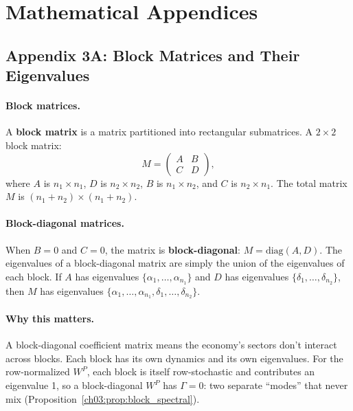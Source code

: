 \documentclass[../structural_economics_book.tex]{subfiles}
\begin{document}
\section*{Mathematical Appendices}

\subsection*{Appendix 3A: Block Matrices and Their Eigenvalues}
\label{ch03:app:block}

\paragraph{Block matrices.} A \textbf{block matrix} is a matrix partitioned into rectangular submatrices. A $2 \times 2$ block matrix:
\begin{equation}
M = \begin{pmatrix} A & B \\ C & D \end{pmatrix},
\end{equation}
where $A$ is $n_1 \times n_1$, $D$ is $n_2 \times n_2$, $B$ is $n_1 \times n_2$, and $C$ is $n_2 \times n_1$. The total matrix $M$ is $(n_1 + n_2) \times (n_1 + n_2)$.

\paragraph{Block-diagonal matrices.} When $B = 0$ and $C = 0$, the matrix is \textbf{block-diagonal}: $M = \text{diag}(A, D)$. The eigenvalues of a block-diagonal matrix are simply the union of the eigenvalues of each block. If $A$ has eigenvalues $\{\alpha_1, \ldots, \alpha_{n_1}\}$ and $D$ has eigenvalues $\{\delta_1, \ldots, \delta_{n_2}\}$, then $M$ has eigenvalues $\{\alpha_1, \ldots, \alpha_{n_1}, \delta_1, \ldots, \delta_{n_2}\}$.

\paragraph{Why this matters.} A block-diagonal coefficient matrix means the economy's sectors don't interact across blocks. Each block has its own dynamics and its own eigenvalues. For the row-normalized $W^P$, each block is itself row-stochastic and contributes an eigenvalue 1, so a block-diagonal $W^P$ has $\Gamma = 0$: two separate ``modes'' that never mix (Proposition~\ref{ch03:prop:block_spectral}).
\end{document}
